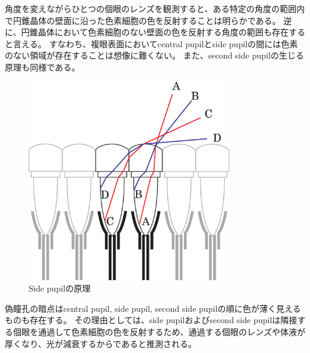 角度を変えながらひとつの個眼のレンズを観測すると、ある特定の角度の範囲内で円錐晶体の壁面に沿った色素細胞の色を反射することは明らかである。
逆に、円錐晶体において色素細胞のない壁面の色を反射する角度の範囲も存在すると言える。
すなわち、複眼表面においてcentral pupilとside pupilの間には色素のない領域が存在することは想像に難くない。
また、second side pupilの生じる原理も同様である。

\begin{figure}[htn]
  \centering
  \includegraphics[width=3.5in]{./img/sidepupil_exp}
  \caption{Side pupilの原理}
  \label{FSidepupilexplanation}
\end{figure}

偽瞳孔の暗点はcentral pupil, side pupil, second side pupilの順に色が薄く見えるものも存在する。
その理由としては、side pupilおよびsecond side pupilは隣接する個眼を通過して色素細胞の色を反射するため、通過する個眼のレンズや体液が厚くなり、光が減衰するからであると推測される。

